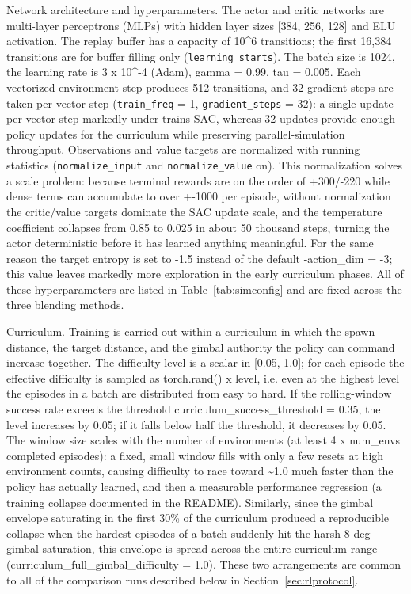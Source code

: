 Network architecture and hyperparameters. The actor and critic networks are multi-layer perceptrons (MLPs) with hidden layer sizes [384, 256, 128] and ELU activation. The replay buffer has a capacity of 10\textasciicircum{}6 transitions; the first 16,384 transitions are for buffer filling only (\texttt{learning\_starts}). The batch size is 1024, the learning rate is 3 x 10\textasciicircum{}-4 (Adam), gamma = 0.99, tau = 0.005. Each vectorized environment step produces 512 transitions, and 32 gradient steps are taken per vector step (\texttt{train\_freq} = 1, \texttt{gradient\_steps} = 32): a single update per vector step markedly under-trains SAC, whereas 32 updates provide enough policy updates for the curriculum while preserving parallel-simulation throughput. Observations and value targets are normalized with running statistics (\texttt{normalize\_input} and \texttt{normalize\_value} on). This normalization solves a scale problem: because terminal rewards are on the order of +300/-220 while dense terms can accumulate to over +-1000 per episode, without normalization the critic/value targets dominate the SAC update scale, and the temperature coefficient collapses from 0.85 to 0.025 in about 50 thousand steps, turning the actor deterministic before it has learned anything meaningful. For the same reason the target entropy is set to -1.5 instead of the default -action\_dim = -3; this value leaves markedly more exploration in the early curriculum phases. All of these hyperparameters are listed in Table~\ref{tab:simconfig} and are fixed across the three blending methods.

Curriculum. Training is carried out within a curriculum in which the spawn distance, the target distance, and the gimbal authority the policy can command increase together. The difficulty level is a scalar in [0.05, 1.0]; for each episode the effective difficulty is sampled as torch.rand() x level, i.e. even at the highest level the episodes in a batch are distributed from easy to hard. If the rolling-window success rate exceeds the threshold curriculum\_success\_threshold = 0.35, the level increases by 0.05; if it falls below half the threshold, it decreases by 0.05. The window size scales with the number of environments (at least 4 x num\_envs completed episodes): a fixed, small window fills with only a few resets at high environment counts, causing difficulty to race toward \textasciitilde{}1.0 much faster than the policy has actually learned, and then a measurable performance regression (a training collapse documented in the README). Similarly, since the gimbal envelope saturating in the first 30\% of the curriculum produced a reproducible collapse when the hardest episodes of a batch suddenly hit the harsh 8 deg gimbal saturation, this envelope is spread across the entire curriculum range (curriculum\_full\_gimbal\_difficulty = 1.0). These two arrangements are common to all of the comparison runs described below in Section~\ref{sec:rlprotocol}.
